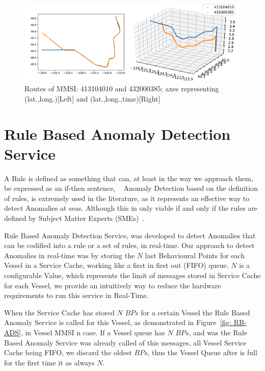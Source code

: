 \begin{figure}[H]
\centering
\includegraphics[width=\textwidth]{figures/Ch4/VesselRendevouz.png}
\caption{Routes of MMSI: 413104010 and 432000385; axes representing (lat.,long.)[Left]
and (lat.,long.,time)[Right]}
\label{fig: Ch4 VesselRendevouz}
\end{figure}





\section{Rule Based Anomaly Detection Service}
\label{section: 4 Rule Based Anomaly Detection}
A Rule is defined as something that can, at least in the way we approach them, be expressed as an if-then sentence, ~\cite{Edlund2006Rule-basedSurveillance}
Anomaly Detection based on the definition of rules, is extremely used in the literature, as it represents an effective way to detect Anomalies at seas. Although this in only viable if and only if the rules are defined by Subject Matter Experts (SMEs)~\cite{Boinepalli2014AAlgorithm, Will2011FastProcesses}.

Rule Based Anomaly Detection Service, was developed to detect Anomalies that can be codified into a rule or a set of rules, in real-time. 
Our approach to detect Anomalies in real-time was by storing the $N$ last Behavioural Points for each Vessel in a Service Cache, working like a first in first out (FIFO) queue. $N$ is a configurable Value, which represents the limit of messages stored in Service Cache for each Vessel, we provide an intuitively way to reduce the hardware requirements to run this service in Real-Time.

When the Service Cache has stored $N$ $BPs$ for a certain Vessel the Rule Based Anomaly Service is called for this Vessel, as demonstrated in Figure~\ref{fig: RB-ADS}, in Vessel MMSI n case.
If a Vessel queue has $N$ $BPs$, and was the Rule Based Anomaly Service was already called of this messages, all Vessel Service Cache being FIFO, we discard the oldest $BPs$, thus the Vessel Queue after is full for the first time it as always $N$.

